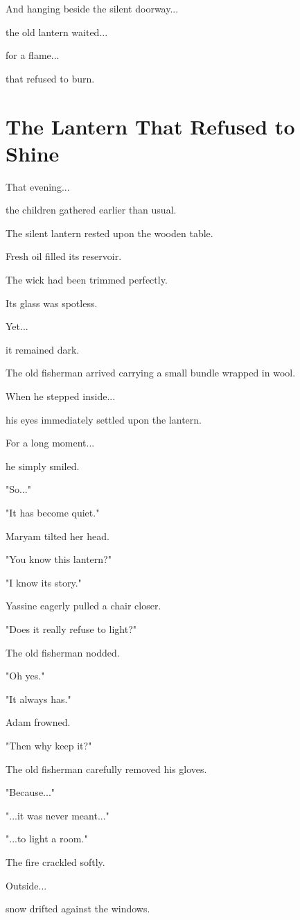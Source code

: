 \documentclass[12pt,openany]{book}
\begin{document}
And hanging beside the silent doorway...

the old lantern waited...

for a flame...

that refused to burn.
\section*{The Lantern That Refused to Shine}

That evening...

the children gathered earlier than usual.

The silent lantern rested upon the wooden table.

Fresh oil filled its reservoir.

The wick had been trimmed perfectly.

Its glass was spotless.

Yet...

it remained dark.

The old fisherman arrived carrying a small bundle wrapped in wool.

When he stepped inside...

his eyes immediately settled upon the lantern.

For a long moment...

he simply smiled.

"So..."

"It has become quiet."

Maryam tilted her head.

"You know this lantern?"

"I know its story."

Yassine eagerly pulled a chair closer.

"Does it really refuse to light?"

The old fisherman nodded.

"Oh yes."

"It always has."

Adam frowned.

"Then why keep it?"

The old fisherman carefully removed his gloves.

"Because..."

"...it was never meant..."

"...to light a room."

The fire crackled softly.

Outside...

snow drifted against the windows.
\end{document}
